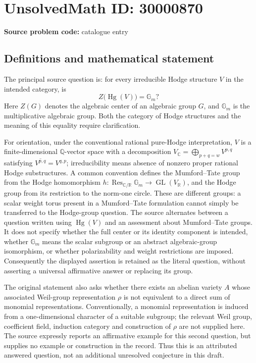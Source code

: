 \documentclass[11pt]{article}
\newcommand{\Q}{\mathbb{Q}}
\newcommand{\R}{\mathbb{R}}
\newcommand{\C}{\mathbb{C}}
\begin{document}
\section*{UnsolvedMath ID: 30000870}
\textbf{Source problem code:} catalogue entry
\subsection{Definitions and mathematical statement}
The principal source question is: for every irreducible Hodge structure $V$ in the intended category, is
\[
Z\bigl(\operatorname{Hg}(V)\bigr)=\mathbb G_m?
\]
Here $Z(G)$ denotes the algebraic center of an algebraic group $G$, and $\mathbb G_m$ is the multiplicative algebraic group. Both the category of Hodge structures and the meaning of this equality require clarification.

For orientation, under the conventional rational pure-Hodge interpretation, $V$ is a finite-dimensional $\Q$-vector space with a decomposition $V_{\C}=\bigoplus_{p+q=w}V^{p,q}$ satisfying $\overline{V^{p,q}}=V^{q,p}$; irreducibility means absence of nonzero proper rational Hodge substructures. A common convention defines the Mumford--Tate group from the Hodge homomorphism $h:\operatorname{Res}_{\C/\R}\mathbb G_m\to\operatorname{GL}(V_{\R})$, and the Hodge group from its restriction to the norm-one circle. These are different groups: a scalar weight torus present in a Mumford--Tate formulation cannot simply be transferred to the Hodge-group question. The source alternates between a question written using $\operatorname{Hg}(V)$ and an assessment about Mumford--Tate groups. It does not specify whether the full center or its identity component is intended, whether $\mathbb G_m$ means the scalar subgroup or an abstract algebraic-group isomorphism, or whether polarizability and weight restrictions are imposed. Consequently the displayed assertion is retained as the literal question, without asserting a universal affirmative answer or replacing its group.

The original statement also asks whether there exists an abelian variety $A$ whose associated Weil-group representation $\rho$ is not equivalent to a direct sum of monomial representations. Conventionally, a monomial representation is induced from a one-dimensional character of a suitable subgroup; the relevant Weil group, coefficient field, induction category and construction of $\rho$ are not supplied here. The source expressly reports an affirmative example for this second question, but supplies no example or construction in the record. Thus this is an attributed answered question, not an additional unresolved conjecture in this draft.
\end{document}
